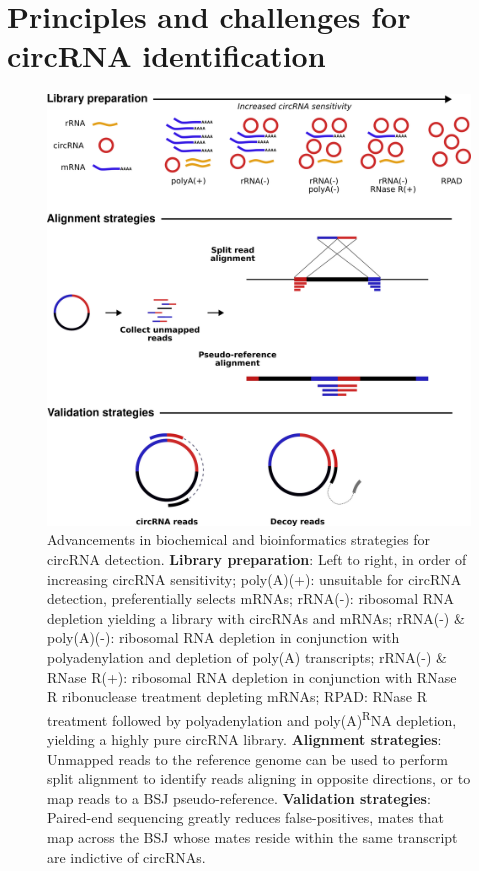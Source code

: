 \documentclass[pdflatex,sn-mathphys-num]{sn-jnl}
\begin{document}
\section{Principles and challenges for circRNA identification}

\begin{figure}
    \begin{center}
        \includegraphics[width=\textwidth]{Figure2.png}
        \caption{Advancements in biochemical and bioinformatics strategies for circRNA detection. \textbf{Library preparation}: Left to right, in order of increasing circRNA sensitivity; poly(A)(+): unsuitable for circRNA detection, preferentially selects mRNAs; rRNA(-): ribosomal RNA depletion yielding a library with circRNAs and mRNAs; rRNA(-) \& poly(A)(-): ribosomal RNA depletion in conjunction with polyadenylation and depletion of poly(A) transcripts; rRNA(-) \& RNase R(+): ribosomal RNA depletion in conjunction with RNase R ribonuclease treatment depleting mRNAs; RPAD: RNase R treatment followed by polyadenylation and poly(A)\textsuperscript RNA depletion, yielding a highly pure circRNA library. \textbf{Alignment strategies}: Unmapped reads to the reference genome can be used to perform split alignment to identify reads aligning in opposite directions, or to map reads to  a BSJ pseudo-reference. \textbf{Validation strategies}: Paired-end sequencing greatly reduces false-positives, mates that map across the BSJ whose mates reside within the same transcript are indictive of circRNAs.}
        \label{artefacts}
    \end{center}
\end{figure}
\end{document}
